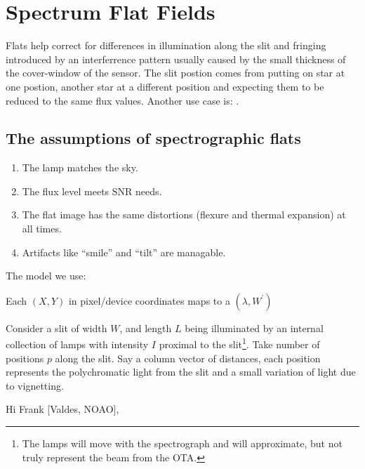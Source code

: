 \renewcommand{\footerfilename}{FlatFielding.tex}

\section{Spectrum Flat Fields} \label{section:SpectrumFlatFields}

Flats help correct for differences in illumination along the slit and
fringing introduced by an interferrence pattern usually caused by the
small thickness of the cover-window of the sensor. The slit postion
comes from putting on star at one postion, another star at a different
position and expecting them to be reduced to the same flux values.
Another use case is: .

\subsection{The assumptions of spectrographic flats}

\vspace{-.15cm}
\begin{enumerate}\addtolength{\itemsep}{-0.5\baselineskip}
   \item   The lamp matches the sky.
   \item   The flux level meets SNR needs.
   \item   The flat image has the same distortions (flexure and thermal expansion)
  at all times.
   \item   Artifacts like ``smile'' and ``tilt'' are managable.
\end{enumerate}

The model we use:

Each $(X,Y)$ in pixel/device coordinates maps to a $(\lambda,W^{\prime})$


Consider a slit of width $W$, and length $L$ being illuminated by an
internal collection of lamps with intensity $I$ proximal to the
slit\footnote{The lamps will move with the spectrograph and will
approximate, but not truly represent the beam from the OTA.}. Take 
number of positions $p$ along the slit. Say a column vector of distances,
each position represents the polychromatic light from the slit and
a small variation of light due to vignetting.





Hi Frank [Valdes, NOAO],

